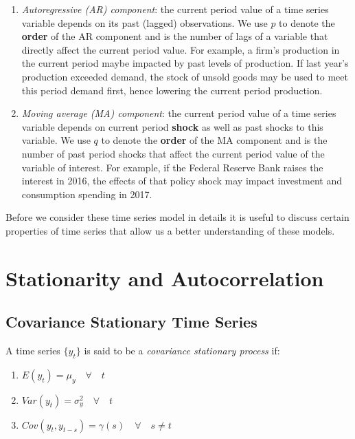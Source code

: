 \documentclass[]{book}
\providecommand{\tightlist}{%
  \setlength{\itemsep}{0pt}\setlength{\parskip}{0pt}}
\theoremstyle{definition}
\theoremstyle{definition}
\theoremstyle{definition}
\theoremstyle{remark}
\let\BeginKnitrBlock\begin \let\EndKnitrBlock\end
\begin{document}
\begin{enumerate}
\def\labelenumi{\arabic{enumi}.}
\item
  \emph{Autoregressive (AR) component}: the current period value of a time series variable depends on its past (lagged) observations. We use \(p\) to denote the \textbf{order} of the AR component and is the number of lags of a variable that directly affect the current period value. For example, a firm's production in the current period maybe impacted by past levels of production. If last year's production exceeded demand, the stock of unsold goods may be used to meet this period demand first, hence lowering the current period production.
\item
  \emph{Moving average (MA) component}: the current period value of a time series variable depends on current period \textbf{shock} as well as past shocks to this variable. We use \(q\) to denote the \textbf{order} of the MA component and is the number of past period shocks that affect the current period value of the variable of interest. For example, if the Federal Reserve Bank raises the interest in 2016, the effects of that policy shock may impact investment and consumption spending in 2017.
\end{enumerate}

Before we consider these time series model in details it is useful to discuss certain properties of time series that allow us a better understanding of these models.

\hypertarget{stationarity-and-autocorrelation}{%
\section{Stationarity and Autocorrelation}\label{stationarity-and-autocorrelation}}

\hypertarget{covariance-stationary-time-series}{%
\subsection{Covariance Stationary Time Series}\label{covariance-stationary-time-series}}

\BeginKnitrBlock{definition}[Covariance Stationary Time Series]
\protect\hypertarget{def:d7}{}{\label{def:d7} {} }
\EndKnitrBlock{definition}

A time series \(\{y_t\}\) is said to be a \emph{covariance stationary process} if:

\begin{enumerate}
\def\labelenumi{\arabic{enumi}.}
\tightlist
\item
  \(E(y_t)=\mu_y \quad \forall \quad t\)
\item
  \(Var(y_t)=\sigma_y^2 \quad \forall \quad t\)
\item
  \(Cov(y_t,y_{t-s})=\gamma(s) \quad \forall \quad s\neq t\)
\end{enumerate}
\end{document}
